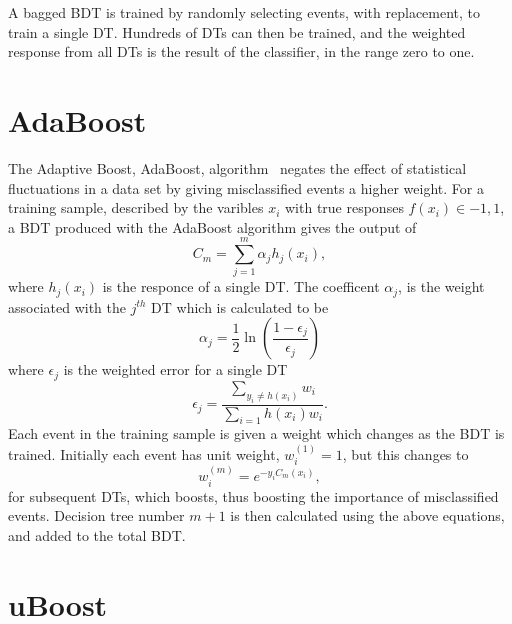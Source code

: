 A bagged BDT is trained by randomly selecting events, with replacement, to train a single DT.
Hundreds of DTs can then be trained, and the weighted response from all DTs is the result of the
classifier, in the range zero to one.





\section{AdaBoost}
\label{sec:bdt:ada}
The Adaptive Boost, AdaBoost, algorithm~\cite{AdaBoost} negates the effect of statistical
fluctuations in a data set
by giving misclassified events a higher weight.
For a training sample, described by the varibles $x_i$ with true responses $f(x_i)\in{-1,1}$,
a BDT produced with the AdaBoost algorithm gives the output of
\begin{equation}
  C_m = \sum_{j=1}^{m}\alpha_jh_j(x_i),
\end{equation}
where $h_j(x_i)$ is the responce of a single DT.
The coefficent $\alpha_j$, is the weight associated with the $j^{th}$ DT which is calculated to be
\begin{equation}
  \alpha_j = \frac12\ln\left(\frac{1-\epsilon_j}{\epsilon_j}\right)
\end{equation}
where $\epsilon_j$ is the weighted error for a single DT
\begin{equation}
  \epsilon_j = \frac{\sum_{y_i\neq h(x_i)}w_i}{\sum_{i=1} h(x_i)w_i}.
\end{equation}
Each event in the training sample is given a weight which changes as the BDT is trained.
Initially each event has unit weight, $w_i^{(1)}=1$, but this changes to
\begin{equation}
  w_i^{(m)} = e^{-y_iC_m(x_i)},
\end{equation}
for subsequent DTs, which boosts, thus boosting the importance of misclassified events.
Decision tree number $m+1$ is then calculated using the above equations, and added to the total
BDT.


\section{uBoost}
\label{sec:bdt:uboost}







